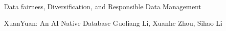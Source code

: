 \documentclass[11pt]{article}
\begin{document}
\begin{bulletin}
\begin{articlesection}{Data fairness, Diversification, and Responsible Data Management}
\begin{article}
{XuanYuan: An AI-Native Database}
{Guoliang Li, Xuanhe Zhou, Sihao Li}
\graphicspath{{submissions/ainative/}}

\end{article}



\end{articlesection}




%
%





\begin{callsection}


\end{callsection}
\end{bulletin}
\end{document}

